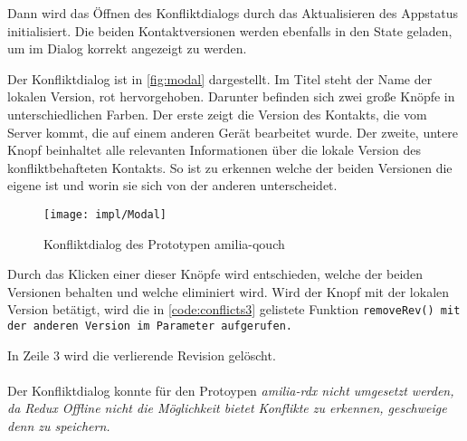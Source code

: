 %
Dann wird das Öffnen des Konfliktdialogs durch das Aktualisieren des \gls{App}status initialisiert.
Die beiden Kontaktversionen werden ebenfalls in den State geladen, um im Dialog korrekt angezeigt zu werden.
%
\begin{center}
  
\end{center}
%
Der Konfliktdialog ist in \autoref{fig:modal} dargestellt.
Im Titel steht der Name der lokalen Version, rot hervorgehoben.
Darunter befinden sich zwei große Knöpfe in unterschiedlichen Farben.
Der erste zeigt die Version des Kontakts, die vom Server kommt, die auf einem anderen Gerät bearbeitet wurde.
Der zweite, untere Knopf beinhaltet alle relevanten Informationen über die lokale Version des konfliktbehafteten Kontakts.
So ist zu erkennen welche der beiden Versionen die eigene ist und worin sie sich von der anderen unterscheidet.
%
\begin{figure}[H]
  \centering
  \texttt{[image: impl/Modal]}
  \grayRule
  \caption{Konfliktdialog des Prototypen amilia-qouch}
  \label{fig:modal}
\end{figure}
%
Durch das Klicken einer dieser Knöpfe wird entschieden, welche der beiden Versionen behalten und welche eliminiert wird.
Wird der Knopf mit der lokalen Version betätigt, wird die in \autoref{code:conflicts3} gelistete Funktion \tt{removeRev()} mit der anderen Version im Parameter aufgerufen.
%
\begin{center}
  
\end{center}
%
In Zeile 3 wird die verlierende Revision gelöscht.\\\\
%
%
Der Konfliktdialog konnte für den Protoypen \it{amilia-rdx} nicht umgesetzt werden, da Redux Offline nicht die Möglichkeit bietet Konflikte zu erkennen, geschweige denn zu speichern.